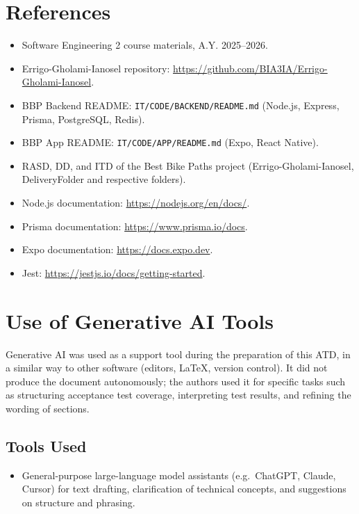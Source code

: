 \section{References}
\label{sec:references}%
\begin{itemize}
    \item Software Engineering 2 course materials, A.Y. 2025--2026.
    \item Errigo-Gholami-Ianosel repository: \href{https://github.com/BIA3IA/Errigo-Gholami-Ianosel}{https://github.com/BIA3IA/Errigo-Gholami-Ianosel}.
    \item BBP Backend README: \texttt{IT/CODE/BACKEND/README.md} (Node.js, Express, Prisma, PostgreSQL, Redis).
    \item BBP App README: \texttt{IT/CODE/APP/README.md} (Expo, React Native).
    \item RASD, DD, and ITD of the Best Bike Paths project (Errigo-Gholami-Ianosel, DeliveryFolder and respective folders).
    \item Node.js documentation: \href{https://nodejs.org/en/docs/}{https://nodejs.org/en/docs/}.
    \item Prisma documentation: \href{https://www.prisma.io/docs}{https://www.prisma.io/docs}.
    \item Expo documentation: \href{https://docs.expo.dev}{https://docs.expo.dev}.
    \item Jest: \href{https://jestjs.io/docs/getting-started}{https://jestjs.io/docs/getting-started}.
\end{itemize}

\section{Use of Generative AI Tools}
\label{sec:ai_tools}%
Generative AI was used as a support tool during the preparation of this ATD, in a similar way to other software (editors, LaTeX, version control). It did not produce the document autonomously; the authors used it for specific tasks such as structuring acceptance test coverage, interpreting test results, and refining the wording of sections.

\subsection{Tools Used}
\begin{itemize}
    \item General-purpose large-language model assistants (e.g.\ ChatGPT, Claude, Cursor) for text drafting, clarification of technical concepts, and suggestions on structure and phrasing.
\end{itemize}


